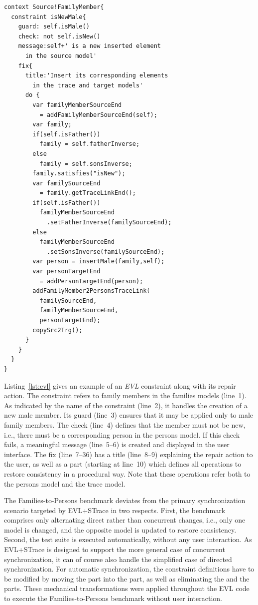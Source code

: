 \begin{lstlisting}[label={lst:evl}, float=b!, language=evl, caption={Example of an EVL constraint}]
context Source!FamilyMember{
  constraint isNewMale{
    guard: self.isMale()
    check: not self.isNew()
    message:self+' is a new inserted element 
      in the source model'
    fix{
      title:'Insert its corresponding elements 
        in the trace and target models'
      do {
        var familyMemberSourceEnd 
          = addFamilyMemberSourceEnd(self);
        var family;
        if(self.isFather()) 
          family = self.fatherInverse;
        else 
          family = self.sonsInverse;
        family.satisfies("isNew");
        var familySourceEnd 
          = family.getTraceLinkEnd(); 
        if(self.isFather()) 
          familyMemberSourceEnd
            .setFatherInverse(familySourceEnd);			
        else 
          familyMemberSourceEnd
            .setSonsInverse(familySourceEnd);			
        var person = insertMale(family,self);
        var personTargetEnd 
          = addPersonTargetEnd(person);
        addFamilyMember2PersonsTraceLink(
          familySourceEnd, 
          familyMemberSourceEnd, 
          personTargetEnd);
        copySrc2Trg();
      }
    }
  }
}
\end{lstlisting}

Listing~\ref{lst:evl} gives an example of an \emph{EVL} constraint along with its repair action. The constraint refers to family members in the families models (line~1).
As indicated by the name of the constraint (line~2), it handles the creation of a new male member.
Its guard (line~3) ensures that it may be applied only to male family members.
The check (line~4) defines that the member must not be new, i.e., there must be a corresponding person in the persons model.
If this check fails, a meaningful message (line~5--6) is created and displayed in the user interface.
The fix (line~7--36) has a title (line~8--9) explaining the repair action to the user, as well as a  part (starting at line~10) which defines all operations to restore consistency in a procedural way.
Note that these operations refer both to the persons model and the trace model.

The Families-to-Persons benchmark deviates from the primary synchronization scenario targeted by EVL\-+\-STrace in two respects.
First, the benchmark comprises only alternating direct rather than concurrent changes, i.e., only one model is changed, and the opposite model is updated to restore consistency.
Second, the test suite is executed automatically, without any user interaction.
%
As EVL+STrace is designed to support the more general case of concurrent synchronization, it can of course also handle the simplified case of directed synchronization.
For automatic synchronization, the constraint definitions have to be modified by moving the  part into the  part, as well as eliminating the  and the  parts.
These mechanical transformations were applied throughout the EVL code to execute the Families-to-Persons benchmark without user interaction.


